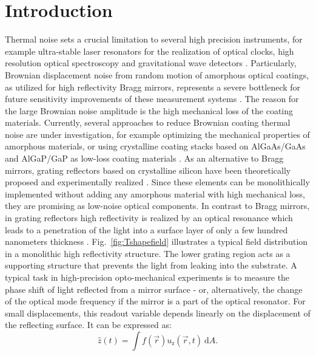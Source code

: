 \documentclass[twocolumn,secnumarabic,amssymb, nobibnotes, aps, prd, showpacs]{revtex4-1}
\begin{document}
\section{Introduction}
Thermal noise sets a crucial limitation to several high precision instruments, for example ultra-stable laser resonators for the realization of optical clocks, high resolution optical spectroscopy and gravitational wave detectors \cite{Sau1990,Num2004,Kes2012, Zha2014, Hag2014, Gra2017}. Particularly, Brownian displacement noise from random motion of amorphous optical coatings, as utilized for high reflectivity Bragg mirrors, represents a severe bottleneck for future sensitivity improvements of these measurement systems \cite{Lev1998, Har2002, Pen2003, Hil2011, Hon2013}. The reason for the large Brownian noise amplitude is the high mechanical loss of the coating materials. Currently, several approaches to reduce Brownian coating thermal noise are under investigation, for example optimizing the mechanical properties of amorphous materials, or using crystalline coating stacks based on AlGaAs/GaAs and AlGaP/GaP as low-loss coating materials \cite{Har2006,Pri2015, Col2013, Cum2015, Lin2015, Gra2016}. \newline
As an alternative to Bragg mirrors, grating reflectors based on crystalline silicon have been theoretically proposed \cite{Bru2008} and experimentally realized \cite{Bru2010, Kro2013, Kro2013a}. Since these elements can be monolithically implemented without adding any amorphous material with high mechanical loss, they are promising as low-noise optical components. In contrast to Bragg mirrors, in grating reflectors high reflectivity is realized by an optical resonance which leads to a penetration of the light into a surface layer of only a few hundred nanometers thickness \cite{Lal2006,Kar2012}. Fig.~\ref{fig:Tshapefield} illustrates a typical field distribution in a monolithic high reflectivity structure. The lower grating region acts as a supporting structure that prevents the light from leaking into the substrate.\newline
A typical task in high-precision opto-mechanical experiments is to measure the phase shift of light reflected from a mirror surface - or, alternatively, the change of the optical mode frequency if the mirror is a part of the optical resonator. For small displacements, this readout variable depends linearly on the displacement of the reflecting surface. It can be expressed as:
\begin{equation}
\hat{z}(t)=\int f(\vec{r})u_\mathrm{z}(\vec{r},t)\ \mathrm{d}A.
\label{Eq:readout}
\end{equation}
\end{document}
